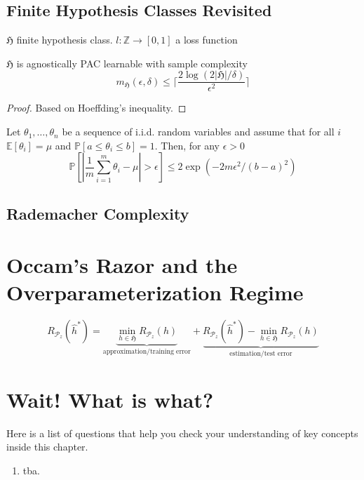 \subsection{Finite Hypothesis Classes Revisited}
$\mathfrak{H}$ finite hypothesis class. $l: \mathbb{Z} \to [0,1]$ a loss function 
	\begin{thm}
	$\mathfrak{H}$ is agnostically PAC learnable with sample complexity
	$$m_{\mathfrak{H}}(\epsilon, \delta) \leq \lceil \frac{2 \log (2
	|\mathfrak{H}|/ \delta)}{\epsilon^2} \rceil$$
\end{thm}
\begin{proof}
	Based on Hoeffding's inequality.
\end{proof}
\begin{thm}
	Let $\theta_1, \dots, \theta_n$ be a sequence of i.i.d. random variables
	and assume that for all $i$ $\mathbb{E}[\theta_i] = \mu$ and
	$\mathbb{P}[a \leq \theta_i \leq b]=1$. Then, for any $\epsilon > 0$
	$$
	\mathbb{P}[|\frac{1}{m} \sum_{i=1}^{m} \theta_i - \mu| > \epsilon] \leq 2 \exp(-2m\epsilon^2/(b-a)^2)
	$$ 	
\end{thm}
\subsection{Rademacher Complexity}

\section{Occam's Razor and the Overparameterization Regime}
$$
	R_{\mathcal{P}_z}(\hat{h}^*) = \underbrace{\min_{h \in \mathfrak{H}} R_{\mathcal{P}_z}(h)}_{\text{approximation/training error}} + \underbrace{R_{\mathcal{P}_z}(\hat{h}^*) - \min_{h \in \mathfrak{H}} R_{\mathcal{P}_z}(h)}_{\text{estimation/test error}} 
	$$

\section*{Wait! What is what?}
Here is a list of questions that help you check your understanding of key
concepts inside this chapter.

\begin{enumerate}
    \item tba. 
\end{enumerate}

